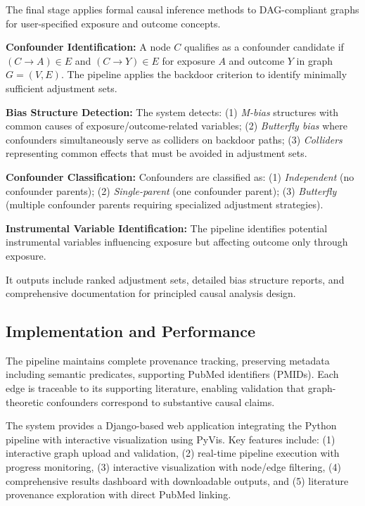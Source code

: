 \documentclass[preprint,12pt,numbers,sort&compress]{elsarticle}
\begin{document}
The final stage applies formal causal inference methods to DAG-compliant graphs for user-specified exposure and outcome concepts.

\textbf{Confounder Identification:} A node $C$ qualifies as a confounder candidate if $(C \to A) \in E$ and $(C \to Y) \in E$ for exposure $A$ and outcome $Y$ in graph $G = (V,E)$. The pipeline applies the backdoor criterion to identify minimally sufficient adjustment sets.

\textbf{Bias Structure Detection:} The system detects: (1) \textit{M-bias} structures with common causes of exposure/outcome-related variables; (2) \textit{Butterfly bias} where confounders simultaneously serve as colliders on backdoor paths; (3) \textit{Colliders} representing common effects that must be avoided in adjustment sets.

\textbf{Confounder Classification:} Confounders are classified as: (1) \textit{Independent} (no confounder parents); (2) \textit{Single-parent} (one confounder parent); (3) \textit{Butterfly} (multiple confounder parents requiring specialized adjustment strategies).

\textbf{Instrumental Variable Identification:} The pipeline identifies potential instrumental variables influencing exposure but affecting outcome only through exposure.

It outputs include ranked adjustment sets, detailed bias structure reports, and comprehensive documentation for principled causal analysis design.

\subsection{Implementation and Performance}

The pipeline maintains complete provenance tracking, preserving metadata including semantic predicates, supporting PubMed identifiers (PMIDs). Each edge is traceable to its supporting literature, enabling validation that graph-theoretic confounders correspond to substantive causal claims.

The system provides a Django-based web application integrating the Python pipeline with interactive visualization using  PyVis. Key features include: (1) interactive graph upload and validation, (2) real-time pipeline execution with progress monitoring, (3) interactive visualization with node/edge filtering, (4) comprehensive results dashboard with downloadable outputs, and (5) literature provenance exploration with direct PubMed linking.
\end{document}
